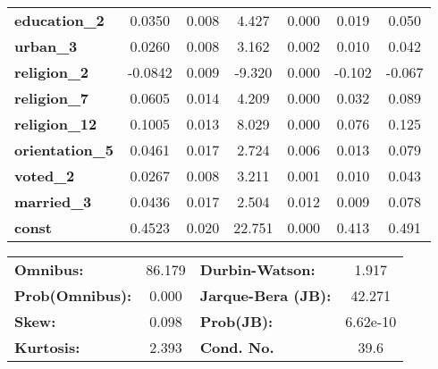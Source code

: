 \documentclass{article}
\begin{document}
\begin{center}
\begin{tabular}{lcccccc}
\textbf{education\_2}   &       0.0350  &        0.008     &     4.427  &         0.000        &        0.019    &        0.050     \\
\textbf{urban\_3}       &       0.0260  &        0.008     &     3.162  &         0.002        &        0.010    &        0.042     \\
\textbf{religion\_2}    &      -0.0842  &        0.009     &    -9.320  &         0.000        &       -0.102    &       -0.067     \\
\textbf{religion\_7}    &       0.0605  &        0.014     &     4.209  &         0.000        &        0.032    &        0.089     \\
\textbf{religion\_12}   &       0.1005  &        0.013     &     8.029  &         0.000        &        0.076    &        0.125     \\
\textbf{orientation\_5} &       0.0461  &        0.017     &     2.724  &         0.006        &        0.013    &        0.079     \\
\textbf{voted\_2}       &       0.0267  &        0.008     &     3.211  &         0.001        &        0.010    &        0.043     \\
\textbf{married\_3}     &       0.0436  &        0.017     &     2.504  &         0.012        &        0.009    &        0.078     \\
\textbf{const}          &       0.4523  &        0.020     &    22.751  &         0.000        &        0.413    &        0.491     \\
\bottomrule
\end{tabular}
\begin{tabular}{lclc}
\textbf{Omnibus:}       & 86.179 & \textbf{  Durbin-Watson:     } &    1.917  \\
\textbf{Prob(Omnibus):} &  0.000 & \textbf{  Jarque-Bera (JB):  } &   42.271  \\
\textbf{Skew:}          &  0.098 & \textbf{  Prob(JB):          } & 6.62e-10  \\
\textbf{Kurtosis:}      &  2.393 & \textbf{  Cond. No.          } &     39.6  \\
\bottomrule
\end{tabular}
\end{center}
\end{document}
